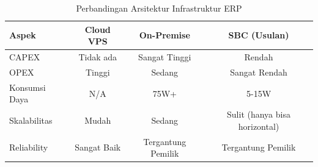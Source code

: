 \begin{table}[h]
\centering
\caption{Perbandingan Arsitektur Infrastruktur ERP}
\label{tab:arsitektur-comparison}
\begin{tabular}{|l|c|c|c|}
\hline
\textbf{Aspek} & \textbf{Cloud VPS} & \textbf{On-Premise} & \textbf{SBC (Usulan)} \\ \hline
CAPEX & Tidak ada & Sangat Tinggi & Rendah \\ \hline
OPEX & Tinggi & Sedang & Sangat Rendah \\ \hline
Konsumsi Daya & N/A & 75W+ & 5-15W \\ \hline
Skalabilitas & Mudah & Sedang & Sulit (hanya bisa horizontal) \\ \hline
Reliability & Sangat Baik & Tergantung Pemilik & Tergantung Pemilik \\ \hline
\end{tabular}
\end{table}
